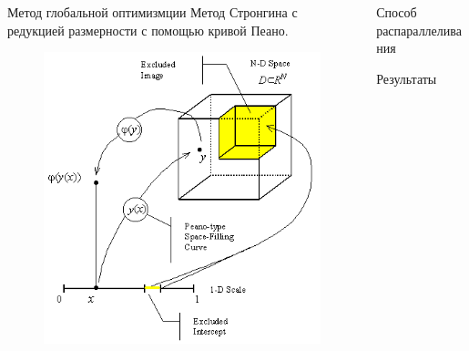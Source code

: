 \documentclass{beamer}
\begin{document}
\begin{frame}[t]
\begin{columns}[t]
\begin{column}[t]{0.48\paperwidth}
\begin{block}{Метод глобальной оптимизмции}
              Метод Стронгина с редукцией размерности с помощью кривой Пеано.\
              \begin{minipage}[t]{.48\textwidth}
              \begin{figure}
                  \centering
                  \includegraphics[scale=1.9]{images/peano1.png}
              \end{figure}
            \end{minipage}
            \end{block}
        \end{column}
        \begin{column}[t]{0.48\paperwidth}
          \begin{block}{Способ распараллеливания}

          \end{block}
            \begin{block}{Результаты}
            \end{block}
        \end{column}
    \end{columns}
\end{frame}
\end{document}
